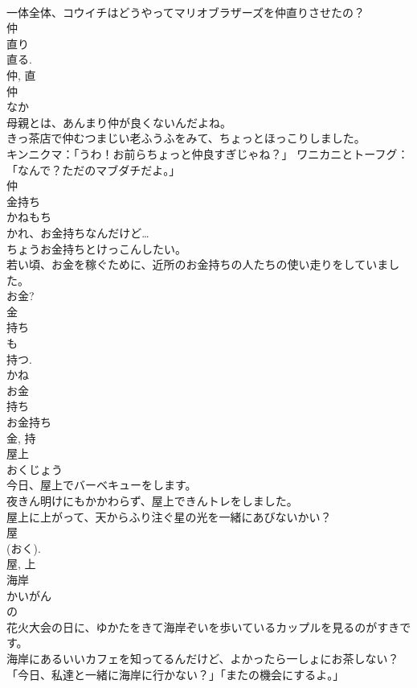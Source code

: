 \documentclass[8pt]{extreport}
\begin{document}
\begin{CJK}{UTF8}{min}
\\	一体全体、コウイチはどうやってマリオブラザーズを仲直りさせたの？	
\\	仲 
\\	直り 
\\	直る. 
\\	仲, 直	
\\	仲	
\\	なか	
\\	母親とは、あんまり仲が良くないんだよね。	
\\	きっ茶店で仲むつまじい老ふうふをみて、ちょっとほっこりしました。	
\\	キンニクマ：「うわ！お前らちょっと仲良すぎじゃね？」 ワニカニとトーフグ：「なんで？ただのマブダチだよ。」	
\\	仲	
\\	金持ち	
\\	かねもち	
\\	かれ、お金持ちなんだけど…	
\\	ちょうお金持ちとけっこんしたい。	
\\	若い頃、お金を稼ぐために、近所のお金持ちの人たちの使い走りをしていました。	
\\	お金? 
\\	金 
\\	持ち 
\\	も 
\\	持つ. 
\\	かね 
\\	お金 
\\	持ち 
\\	お金持ち 
\\	金, 持	
\\	屋上	
\\	おくじょう	
\\	今日、屋上でバーベキューをします。	
\\	夜きん明けにもかかわらず、屋上できんトレをしました。	
\\	屋上に上がって、天からふり注ぐ星の光を一緒にあびないかい？	
\\	屋 
\\	(おく). 
\\	屋, 上	
\\	海岸	
\\	かいがん	
\\	の 
\\	花火大会の日に、ゆかたをきて海岸ぞいを歩いているカップルを見るのがすきです。	
\\	海岸にあるいいカフェを知ってるんだけど、よかったら一しょにお茶しない？	
\\	「今日、私達と一緒に海岸に行かない？」「またの機会にするよ。」	

\end{CJK}
\end{document}
